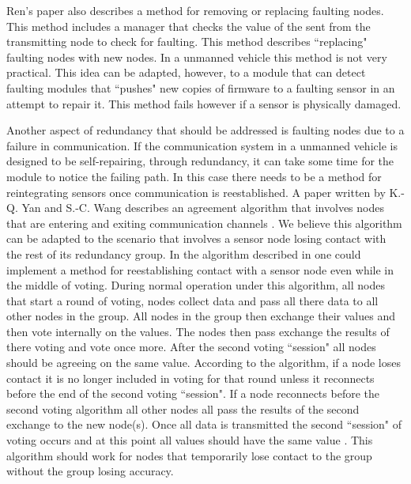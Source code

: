 \documentclass[twoside, conference]{IEEEtran}
\begin{document}
Ren's paper also describes a method for removing or replacing faulting nodes. This method includes a manager that checks the value of the sent from the transmitting node to check for faulting. This method describes ``replacing" faulting nodes with new nodes. In a unmanned vehicle this method is not very practical. This idea can be adapted, however, to a module that can detect faulting modules that ``pushes" new copies of firmware to a faulting sensor in an attempt to repair it. This method fails however if a sensor is physically damaged.\cite{Ren2001}

Another aspect of redundancy that should be addressed is faulting nodes due to a failure in communication. If the communication system in a unmanned vehicle is designed to be self-repairing, through redundancy, it can take some time for the module to notice the failing path. In this case there needs to be a method for reintegrating sensors once communication is reestablished. A paper written by K.-Q. Yan and S.-C. Wang describes an agreement algorithm that involves nodes that are entering and exiting communication channels \cite{Yan2007}. We believe this algorithm can be adapted to the scenario that involves a sensor node losing contact with the rest of its redundancy group. In the algorithm described in \cite{Yan2007} one could implement a method for reestablishing contact with a sensor node even while in the middle of voting. During normal operation under this algorithm, all nodes that start a round of voting, nodes collect data and pass all there data to all other nodes in the group. All nodes in the group then exchange their values and then vote internally on the values. The nodes then pass exchange the results of there voting and vote once more. After the second voting ``session" all nodes should be agreeing on the same value. According to the algorithm, if a node loses contact it is no longer included in voting for that round unless it reconnects before the end of the second voting ``session". If a node reconnects before the second voting algorithm all other nodes all pass the results of the second exchange to the new node(s). Once all data is transmitted the second ``session" of voting occurs and at this point all values should have the same value \cite{Yan2007}. This algorithm should work for nodes that temporarily lose contact to the group without the group losing accuracy.
\end{document}
